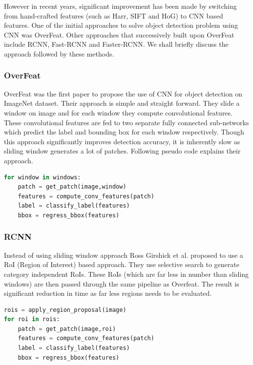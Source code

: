 However in recent years, significant improvement has been made by switching from hand-crafted features (such as Harr, SIFT and HoG) to CNN based features. One of the initial approaches to solve object detection problem using CNN was OverFeat\cite{sermanet2013overfeat}. Other approaches that successively built upon OverFeat include RCNN\cite{ref_rcnn}, Fast-RCNN\cite{ref_fastrcnn} and Faster-RCNN\cite{ren2015faster}. We shall briefly discuss the approach followed by these methods. 

\subsubsection{OverFeat}
OverFeat\cite{sermanet2013overfeat} was the first paper to propose the use of CNN for object detection on ImageNet\cite{ref_imagenet} dataset. Their approach is simple and straight forward. They slide a window on image and for each window they compute convolutional features. These convolutional features are fed to two separate fully connected sub-networks which predict the label and bounding box for each window respectively. Though this approach significantly improves detection accuracy, it is inherently slow as sliding window generates a lot of patches. Following pseudo code explains their approach.

\begin{lstlisting}[language=Python, caption=OverFeat pseudo code]
for window in windows:
    patch = get_patch(image,window)
    features = compute_conv_features(patch)
    label = classify_label(features)
    bbox = regress_bbox(features)
\end{lstlisting}

\subsubsection{RCNN}
Instead of using sliding window approach Ross Girshick et al.\cite{ref_rcnn} proposed to use a RoI (Region of Interest) based approach. They use selective search\cite{uijlings2013selective_search} to generate category independent RoIs. These RoIs (which are far less in number than sliding windows) are then passed through the same pipeline as Overfeat. The result is significant reduction in time as far less regions needs to be evaluated. 

\begin{lstlisting}[language=Python, caption=RCNN pseudo code]
rois = apply_region_proposal(image)
for roi in rois:
    patch = get_patch(image,roi)
    features = compute_conv_features(patch)
    label = classify_label(features)
    bbox = regress_bbox(features)
\end{lstlisting}

